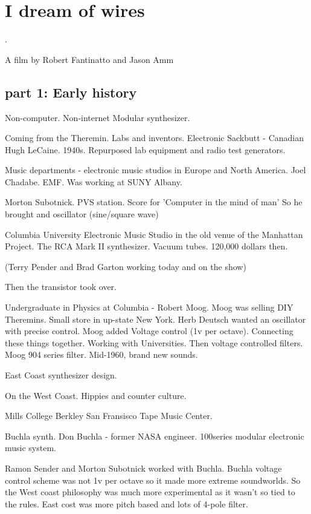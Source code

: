 \chapter{I dream of wires}.

A film by Robert Fantinatto and Jason Amm

\section{part 1: Early history}
Non-computer. Non-internet
Modular synthesizer. 

Coming from the Theremin. Labs and inventors. 
Electronic Sackbutt - Canadian Hugh LeCaine. 1940s.
Repurposed lab equipment and radio test generators. 

Music departments - electronic music studios in Europe and North America. 
Joel Chadabe. EMF. Was working at SUNY Albany. 

Morton Subotnick. PVS station. Score for 'Computer in the mind of man'
So he brought and oscillator (sine/square wave) 

Columbia University Electronic Music Studio in the old venue of the Manhattan Project.
The RCA Mark II synthesizer. Vacuum tubes. 120,000 dollars then. 

(Terry Pender and Brad Garton working today and on the show)

Then the transistor took over. 

Undergraduate in Physics at Columbia - Robert Moog. Moog was selling DIY Theremins. Small store in up-state New York.
Herb Deutsch wanted an oscillator with precise control. Moog added Voltage control (1v per octave). 
Connecting these things together. Working with Universities. Then voltage controlled filters. 
Moog 904 series filter. Mid-1960, brand new sounds. 

East Coast synthesizer design. 

On the West Coast. Hippies and counter culture. 

Mills College Berkley San Fransisco Tape Music Center. 

Buchla synth. Don Buchla - former NASA engineer. 
100series modular electronic music system. 

Ramon Sender and Morton Subotnick worked with Buchla. Buchla voltage control scheme was not 1v per octave so it made more extreme soundworlds. So the West coast philosophy was much more experimental as it wasn't so tied to the rules. East cost was more pitch based and lots of 4-pole filter.  

